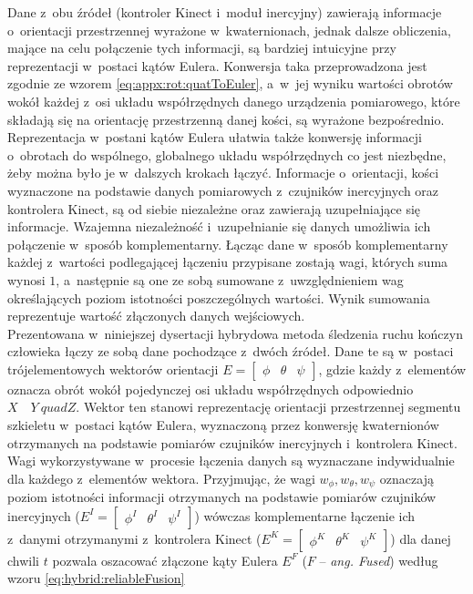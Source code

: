 Dane z~obu źródeł (kontroler Kinect i~moduł inercyjny) zawierają informacje o~orientacji przestrzennej wyrażone w~kwaternionach, jednak dalsze obliczenia, mające na celu połączenie tych informacji, są bardziej intuicyjne przy reprezentacji w~postaci kątów Eulera. Konwersja taka przeprowadzona jest zgodnie ze wzorem \ref{eq:appx:rot:quatToEuler}, a~w~jej wyniku wartości obrotów wokół każdej z~osi układu współrzędnych danego urządzenia pomiarowego, które składają się na orientację przestrzenną danej kości, są wyrażone bezpośrednio. Reprezentacja w~postani kątów Eulera ułatwia także konwersję informacji o~obrotach do wspólnego, globalnego układu współrzędnych co jest niezbędne, żeby można było je w~dalszych krokach łączyć. Informacje o~orientacji, kości wyznaczone na podstawie danych pomiarowych z~czujników inercyjnych oraz kontrolera Kinect, są od siebie niezależne oraz zawierają uzupełniające się informacje. Wzajemna niezależność i~uzupełnianie się danych umożliwia ich połączenie w~sposób komplementarny. Łącząc dane w~sposób komplementarny każdej z~wartości podlegającej łączeniu przypisane zostają wagi, których suma wynosi $1$, a~następnie są one ze sobą sumowane z~uwzględnieniem wag określających poziom istotności poszczególnych wartości. Wynik sumowania reprezentuje wartość złączonych danych wejściowych. \\
										
Prezentowana w~niniejszej dysertacji hybrydowa metoda śledzenia ruchu kończyn człowieka łączy ze sobą dane pochodzące z~dwóch źródeł. Dane te są w~postaci trójelementowych wektorów orientacji $E = \begin{bmatrix} \phi &  \theta & \psi \end{bmatrix}$, gdzie każdy z~elementów oznacza obrót wokół pojedynczej osi układu współrzędnych odpowiednio $X \quad Y\ quad Z$. Wektor ten stanowi reprezentację orientacji przestrzennej segmentu szkieletu w~postaci kątów Eulera, wyznaczoną przez konwersję kwaternionów otrzymanych na podstawie pomiarów czujników inercyjnych i~kontrolera Kinect. Wagi wykorzystywane w~procesie łączenia danych są wyznaczane indywidualnie dla każdego z~elementów wektora. Przyjmując, że wagi $w_\phi , w_\theta , w_\psi$ oznaczają poziom istotności informacji otrzymanych na podstawie pomiarów czujników inercyjnych ($E^I = \begin{bmatrix}  \phi^I &  \theta^I &  \psi^I \end{bmatrix}$) wówczas komplementarne łączenie ich z~danymi otrzymanymi z~kontrolera Kinect ($E^K = \begin{bmatrix}  \phi^K &  \theta^K &  \psi^K \end{bmatrix}$) dla danej chwili $t$ pozwala oszacować złączone kąty Eulera $E^F$ ($F$ -- \emph{ang. Fused}) według wzoru \ref{eq:hybrid:reliableFusion}
										
